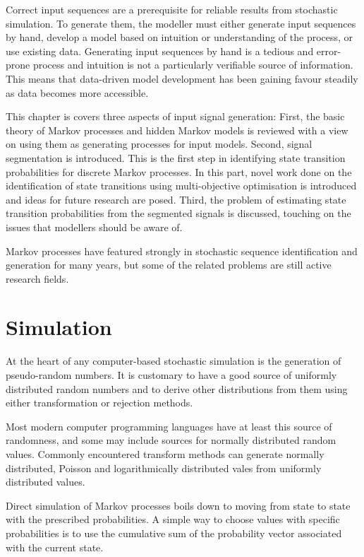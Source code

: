 Correct input sequences are a prerequisite for reliable results from stochastic simulation.
To generate them, the modeller must either generate input sequences by hand, develop a model based on intuition or understanding of the process, or use existing data.
Generating input sequences by hand is a tedious and error-prone process and intuition is not a particularly verifiable source of information.
This means that data-driven model development has been gaining favour steadily as data becomes more accessible.

This chapter is covers three aspects of input signal generation:
First, the basic theory of Markov processes and hidden Markov models is reviewed with a view on using them as generating processes for input models.
Second, signal segmentation is introduced.
This is the first step in identifying state transition probabilities for discrete Markov processes.
In this part, novel work done on the identification of state transitions using multi-objective optimisation is introduced and ideas for future research are posed.
Third, the problem of estimating state transition probabilities from the segmented signals is discussed, touching on the issues that modellers should be aware of.

Markov processes have featured strongly in stochastic sequence identification and generation for many years, but some of the related problems are still active research fields.


\section{Simulation}
At the heart of any computer-based stochastic simulation is the generation of pseudo-random numbers.
It is customary to have a good source of uniformly distributed random numbers and to derive other distributions from them using either transformation or rejection methods.

Most modern computer programming languages have at least this source of randomness, and some may include sources for normally distributed random values.
Commonly encountered transform methods can generate normally distributed, Poisson and logarithmically distributed vales from uniformly distributed values.~\citep{gamerman.lopes2006markov}

Direct simulation of Markov processes boils down to moving from state to state with the prescribed probabilities.
A simple way to choose values with specific probabilities is to use the cumulative sum of the probability vector associated with the current state.

